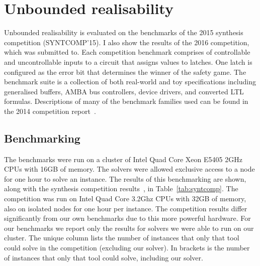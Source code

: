 
\clearpage

\section{Unbounded realisability}

Unbounded realisability is evaluated on the benchmarks of the 2015 synthesis competition (SYNTCOMP'15). I also show the results of the 2016 competition, which \termitesat was submitted to. Each competition benchmark comprises of controllable and uncontrollable inputs to a circuit that assigns values to latches. One latch is configured as the error bit that determines the winner of the safety game. The benchmark suite is a collection of both real-world and toy specifications including generalised buffers, AMBA bus controllers, device drivers, and converted LTL formulas.  Descriptions of many of the benchmark families used can be found in the 2014 competition report~\cite{Jacobs15}. 

\subsection{Benchmarking}

The benchmarks were run on a cluster of Intel Quad Core Xeon E5405 2GHz CPUs with 16GB of memory.  The solvers were allowed exclusive access to a node for one hour to solve an instance.  The results of this benchmarking are shown, along with the synthesis competition results~\cite{syntcompedacc}, in Table~\ref{tab:syntcomp}. The competition was run on Intel Quad Core 3.2Ghz CPUs with 32GB of memory, also on isolated nodes for one hour per instance. The competition results differ significantly from our own benchmarks due to this more powerful hardware.  For our benchmarks we report only the results for solvers we were able to run on our cluster. The unique column lists the number of instances that only that tool could solve in the competition (excluding our solver). In brackets is the number of instances that only that tool could solve, including our solver.

